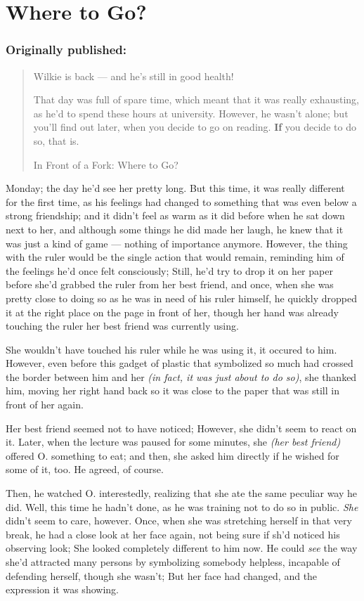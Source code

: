 \chapter{Where to Go?}
\label{cha:where-to-go}
\subsection*{Originally published: }
\begin{quote}
Wilkie is back --- and he's still in good health!

That day was full of spare time, which meant that it was really exhausting, as he'd to spend these hours at university. 
However, he wasn't alone; but you'll find out later, when you decide to go on reading. 
\textbf{If} you decide to do so, that is.

In Front of a Fork: Where to Go?
\end{quote}

Monday; the day he'd see her pretty long. But this time, it was really different for the first time, as his feelings had changed to something that was even below a strong friendship; and it didn't feel as warm as it did before when he sat down next to her, and although some things he did made her laugh, he knew that it was just a kind of game --- nothing of importance anymore. However, the thing with the ruler would be the single action that would remain, reminding him of the feelings he'd once felt consciously; Still, he'd try to drop it on her paper before she'd grabbed the ruler from her best friend, and once, when she was pretty close to doing so as he was in need of his ruler himself, he quickly dropped it at the right place on the page in front of her, though her hand was already touching the ruler her best friend was currently using.

She wouldn't have touched his ruler while he was using it, it occured to him. However, even before this gadget of plastic that symbolized so much had crossed the border between him and her \emph{(in fact, it was just about to do so)}, she thanked him, moving her right hand back so it was close to the paper that was still in front of her again.

Her best friend seemed not to have noticed; However, she didn't seem to react on it. Later, when the lecture was paused for some minutes, she \emph{(her best friend)} offered O. something to eat; and then, she asked him directly if he wished for some of it, too. 
He agreed, of course.

Then, he watched O. interestedly, realizing that she ate the same peculiar way he did. Well, this time he hadn't done, as he was training not to do so in public. 
\emph{She} didn't seem to care, however. Once, when she was stretching herself in that very break, he had a close look at her face again, not being sure if sh'd noticed his observing look; She looked completely different to him now. He could \emph{see} the way she'd attracted many persons by symbolizing somebody helpless, incapable of defending herself, though she wasn't; But her face had changed, and the expression it was showing.

